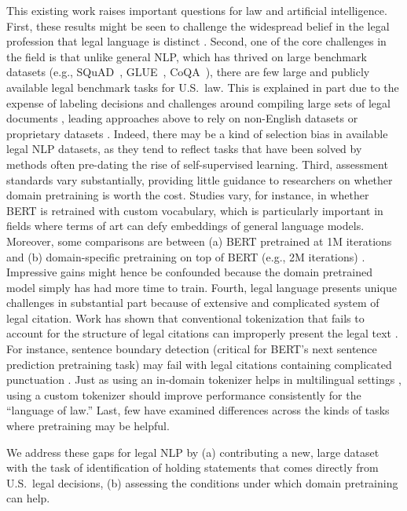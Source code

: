 \documentclass[sigconf]{acmart}
\begin{document}
This existing work raises important questions for law and artificial intelligence.  First, these results might be seen to challenge the widespread belief in the legal profession that legal language is distinct \cite{mellinkoff2004language,mertz2007language, tiersma1999legal}.  Second, one of the core challenges in the field is that unlike general NLP, which has thrived on large benchmark datasets (e.g., SQuAD~\cite{Rajpurkar2016}, GLUE~\cite{Wang2018}, CoQA~\cite{reddy2019coqa}), there are few large and publicly available legal benchmark tasks for U.S.\ law.  This is explained in part due to the expense of labeling decisions and challenges around compiling large sets of legal documents \cite{Pah134}, leading approaches above to rely on non-English datasets \cite{zhong2020does, zhong2020jec} or proprietary datasets \cite{Elwany2019}. Indeed, there may be a kind of selection bias in available legal NLP datasets, as they tend to reflect tasks that have been solved by methods often pre-dating the rise of self-supervised learning. Third, assessment standards vary substantially, providing little guidance to researchers on whether domain pretraining is worth the cost.  Studies vary, for instance, in whether BERT is retrained with custom vocabulary, which is particularly important in fields where terms of art can defy embeddings of general language models.  Moreover, some comparisons are between (a) BERT pretrained at 1M iterations and (b) domain-specific pretraining on top of BERT (e.g., 2M iterations) \cite{lee_biobert_2019}. Impressive gains might hence be confounded because the domain pretrained model simply has had more time to train. Fourth, legal language presents unique challenges in substantial part because of extensive and complicated system of legal citation. Work has shown that conventional tokenization that fails to account for the structure of legal citations can improperly present the legal text \cite{bommarito2018lexnlp}.  For instance, sentence boundary detection (critical for BERT's next sentence prediction pretraining task) may fail with legal citations containing complicated punctuation \cite{savelka2017sentence}. Just as using an in-domain tokenizer helps in multilingual settings \cite{rust2020good}, using a custom tokenizer should improve performance consistently for the ``language of law.'' Last, few have examined differences across the kinds of tasks where pretraining may be helpful.

We address these gaps for legal NLP by (a) contributing a new, large dataset with the task of identification of holding statements that comes directly from U.S.\ legal decisions, (b) assessing the conditions under which domain pretraining can help. 
\end{document}
